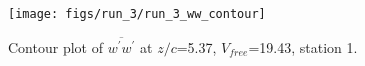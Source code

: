 \begin{figure}[H]
\centering
\texttt{[image: figs/run\_3/run\_3\_ww\_contour]}
\caption{Contour plot of $\overline{w^\prime w^\prime}$ at $z/c$=5.37, $V_{free}$=19.43, station 1.}
\label{fig:run_3_ww_contour}
\end{figure}


